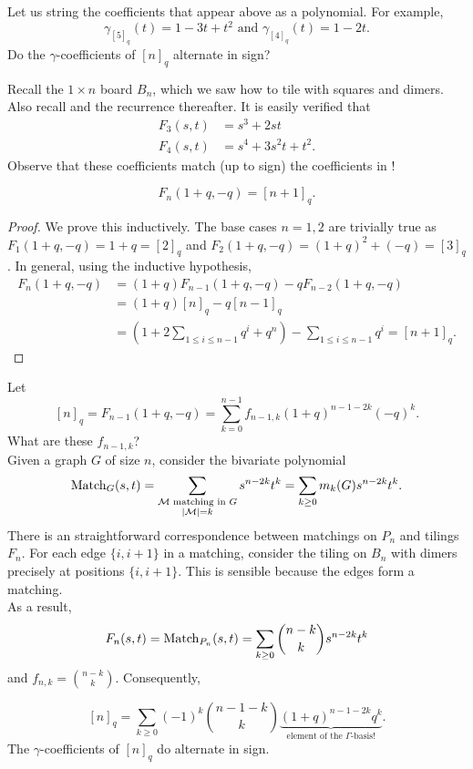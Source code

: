 	Let us string the coefficients that appear above as a polynomial. For example,
	\begin{equation}
		\label{eqn: gamma example}
		\gamma_{[5]_q}(t) = 1-3t+t^2 \text{ and } \gamma_{[4]_q}(t) = 1-2t.
	\end{equation}
	Do the $\gamma$-coefficients of $[n]_q$ alternate in sign?

	Recall the $1 \times n$ board $B_n$, which we saw how to tile with squares and dimers. Also recall  and the recurrence thereafter. It is easily verified that
	\begin{align*}
		F_3(s,t) &= s^3 + 2st \\
		F_4(s,t) &= s^4 + 3s^2t + t^2.
	\end{align*}
	Observe that these coefficients match (up to sign) the coefficients in !

	\begin{flem}
		\[ F_n(1+q,-q) = [n+1]_q. \]
	\end{flem}
	\begin{proof}
		We prove this inductively. The base cases $n=1,2$ are trivially true as $F_1(1+q,-q) = 1+q = [2]_q$ and $F_2(1+q,-q) = (1+q)^2 + (-q) = [3]_q$. In general, using the inductive hypothesis,
		\begin{align*}
			F_n(1+q,-q) &= (1+q)F_{n-1}(1+q,-q) - qF_{n-2}(1+q,-q) \\
				&= (1+q)[n]_q - q[n-1]_q \\
				&= \left(1 + 2\sum_{1 \le i \le n-1} q^i + q^n\right) - \sum_{1 \le i \le n-1} q^i = [n+1]_q.
		\end{align*}
	\end{proof}

	Let
	\[ [n]_q = F_{n-1}(1+q,-q) = \sum_{k = 0}^{n-1} f_{n-1,k} (1+q)^{n-1-2k}(-q)^k. \]
	What are these $f_{n-1,k}$?\\

	Given a graph $G$ of size $n$, consider the bivariate polynomial
	\[ \operatorname{Match}_G(s,t) = \sum_{\substack{\text{$\mathcal{M}$ matching in $G$} \\ |\mathcal{M}| = k}} s^{n-2k} t^k = \sum_{k \ge 0} m_k(G) s^{n-2k} t^k . \]
	There is an straightforward correspondence between matchings on $P_n$ and tilings $F_n$. For each edge $\{i,i+1\}$ in a matching, consider the tiling on $B_n$ with dimers precisely at positions $\{i,i+1\}$. This is sensible because the edges form a matching.\\
	As a result,
	\[ F_n(s,t) = \operatorname{Match}_{P_n}(s,t) = \sum_{k \ge 0} \binom{n-k}{k} s^{n-2k} t^k \]
	and $f_{n,k} = \binom{n-k}{k}$. Consequently,

	\[ [n]_q = \sum_{k \ge 0} (-1)^k \binom{n-1-k}{k} \underbrace{(1+q)^{n-1-2k} q^k}_{\text{element of the $\Gamma$-basis!}}. \]
	The $\gamma$-coefficients of $[n]_q$ do alternate in sign.